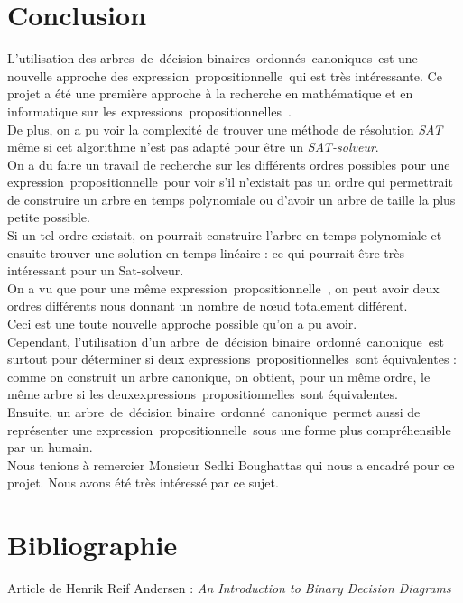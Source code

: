 \documentclass[a4paper, oneside]{report}
\newcommand{\adb}{arbre~de~décision binaire~}
\newcommand{\adbs}{arbres~de~décision binaires~}
\newcommand{\adbo}{\adb ordonné~}
\newcommand{\adbos}{\adbs ordonnés~}
\newcommand{\adboc}{\adbo canonique~}
\newcommand{\adbocs}{\adbos canoniques~}
\newcommand{\expp}{expression~propositionnelle~}
\newcommand{\expps}{expressions~propositionnelles~}
\begin{document}
\chapter*{Conclusion}
L'utilisation des \adbocs est une nouvelle approche des \expp qui est très intéressante. Ce projet a été une première approche à la recherche en mathématique et en informatique sur les \expps.\\
De plus, on a pu voir la complexité de trouver une méthode de résolution \textit{SAT} même si cet algorithme n'est pas adapté pour être un \textit{SAT-solveur}.\\
On a du faire un travail de recherche sur les différents ordres possibles pour une \expp pour voir s'il n'existait pas un ordre qui permettrait de construire un arbre en temps polynomiale ou d'avoir un arbre de taille la plus petite possible.\\
Si un tel ordre existait, on pourrait construire l'arbre en temps polynomiale et ensuite trouver une solution en temps linéaire : ce qui pourrait être très intéressant pour un Sat-solveur.\\
On a vu que pour une même \expp, on peut avoir deux ordres différents nous donnant un nombre de nœud totalement différent.\\
Ceci est une toute nouvelle approche possible qu'on a pu avoir.\\
Cependant, l'utilisation d'un \adboc est surtout pour déterminer si deux \expps sont équivalentes : comme on construit un arbre canonique, on obtient, pour un même ordre, le même arbre si les deux\expps sont équivalentes.\\
Ensuite, un \adboc permet aussi de représenter une \expp sous une forme plus compréhensible par un humain.\\
Nous tenions à remercier Monsieur Sedki Boughattas qui nous a encadré pour ce projet. Nous avons été très intéressé par ce sujet.
\chapter*{Bibliographie}
Article de Henrik Reif Andersen : \textit{An Introduction to Binary Decision Diagrams}
\end{document}
